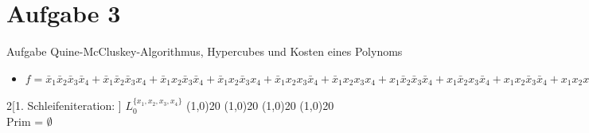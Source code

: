 
\section{Aufgabe 3}

\setcounter{exercise}{1}

\begin{frame}[allowframebreaks]{Aufgabe \thesection}{Quine-McCluskey-Algorithmus, Hypercubes und Kosten eines Polynoms}
  
        \begin{requirementsnoinc}
          \begin{itemize}
            \item $f = \bar x_1\bar x_2\bar x_3\bar x_4 + \bar x_1\bar x_2\bar x_3x_4 + \bar x_1x_2\bar x_3\bar x_4 + \bar x_1x_2\bar x_3x_4 + \bar x_1x_2x_3\bar x_4 + \bar x_1x_2x_3x_4 + x_1\bar x_2\bar x_3\bar x_4 + x_1\bar x_2x_3\bar x_4 +x_1x_2\bar x_3\bar x_4 +x_1x_2x_3\bar x_4 +x_1x_2x_3x_4$ \newline
          \end{itemize}
        \end{requirementsnoinc}
    
    \begin{solutionnoinc}
      \begin{multicols*}{2}[1. Schleifeniteration: ]
        \tiny
          $L^{\{x_1,x_2,x_3,x_4\}}_0$  \newline
          \line(1,0){20}   \newline
          \line(1,0){20}    \newline
          \line(1,0){20}  \newline
          \line(1,0){20} \\[0.25cm]
          Prim = $\emptyset$
          \columnbreak \newline
      \end{multicols*}
    \end{solutionnoinc}
    

\end{frame}
